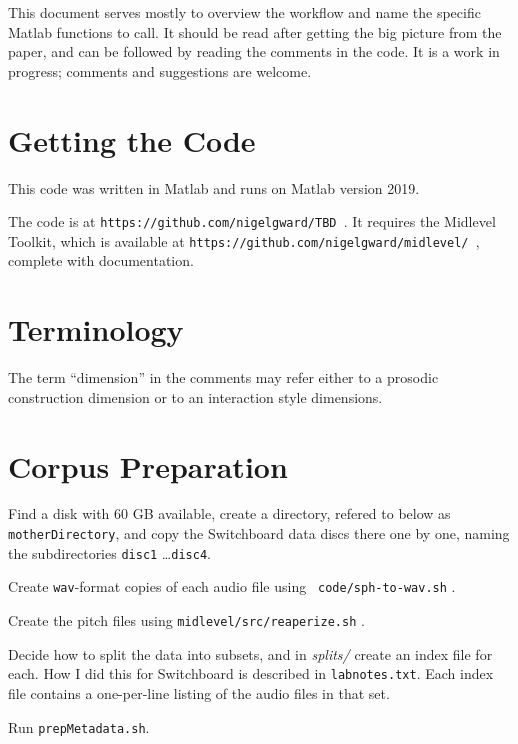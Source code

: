 \documentclass[11pt]{article}
\begin{document}
This document serves mostly to overview the workflow and name the
specific Matlab functions to call.  It should be read after getting
the big picture from the paper, and can be followed by reading the
comments in the code. It is a work in progress; comments and
suggestions are welcome.


\section{Getting the Code}  \label{sec:starting}

This code was written in Matlab and runs on Matlab version 2019.

The code is at {\tt https://github.com/nigelgward/TBD }.  It requires
the Midlevel Toolkit, which is available at 
{\tt https://github.com/nigelgward/midlevel/ }, complete with documentation. 

\section{Terminology}

The term ``dimension'' in the comments may refer either to a prosodic
construction dimension or to an interaction style dimensions.

\section{Corpus Preparation }

Find a disk with 60 GB available, create a directory, refered to below
as {\tt motherDirectory}, and copy the Switchboard data discs there
one by one, naming the subdirectories {\tt disc1} \ldots {\tt disc4}.

Create {\tt wav}-format copies of each audio file using {\tt
  code/sph-to-wav.sh} .

Create the pitch files using {\tt midlevel/src/reaperize.sh} .

Decide how to split the data into subsets, and in {\it splits/} create
an index file for each. How I did this for Switchboard is described in
{\tt labnotes.txt}.  Each index file contains a one-per-line listing
of the audio files in that set.

Run {\tt prepMetadata.sh}.
\end{document}
